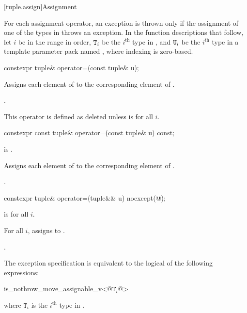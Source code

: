 \documentclass{wg21}
\begin{document}
[tuple.assign]{Assignment}

\pnum
For each  assignment operator, an exception is thrown only if the
assignment of one of the types in  throws an exception.
In the function descriptions that follow, let $i$ be in the range 
in order, $\texttt{T}_i$ be the $i^\text{th}$ type in ,
and $\texttt{U}_i$ be the $i^\text{th}$ type in a
template parameter pack named , where indexing is zero-based.

%
\begin{itemdecl}
    constexpr tuple& operator=(const tuple& u);
\end{itemdecl}

\begin{itemdescr}
    \pnum
    \effects
    Assigns each element of  to the corresponding
    element of .
    
    \pnum
    \returns
    .
    
    \pnum
    \remarks
    This operator is defined as deleted unless
     is  for all $i$.
\end{itemdescr}

%
\begin{itemdecl}
    constexpr const tuple& operator=(const tuple& u) const;
\end{itemdecl}

\begin{itemdescr}
    \pnum
    \constraints
     is .
    
    \pnum
    \effects
    Assigns each element of  to the corresponding element of .
    
    \pnum
    \returns
    .
\end{itemdescr}

%
\begin{itemdecl}
    constexpr tuple& operator=(tuple&& u) noexcept(@\seebelow@);
\end{itemdecl}

\begin{itemdescr}
    \pnum
    \constraints
     is  for all $i$.
    
    \pnum
    \effects
    For all $i$, assigns  to
    .
    
    \pnum
    \returns
    .
    
    \pnum
    \remarks
    The exception specification is equivalent to the logical  of the
    following expressions:
    
    \begin{codeblock}
        is_nothrow_move_assignable_v<@$\mathtt{T}_i$@>
    \end{codeblock}
    where $\mathtt{T}_i$ is the $i^\text{th}$ type in .
\end{itemdescr}
\end{document}
